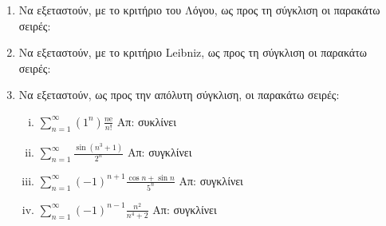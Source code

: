\begin{enumerate}
  \item Να εξεταστούν, με το κριτήριο του Λόγου, ως προς τη σύγκλιση οι παρακάτω σειρές: 


  \item Να εξεταστούν, με το κριτήριο Leibniz, ως προς τη σύγκλιση οι παρακάτω σειρές: 


  \item Να εξεταστούν, ως προς την απόλυτη σύγκλιση, οι παρακάτω σειρές: 

    \begin{enumerate}[i)]
      \item $ \sum_{n=1}^{\infty} (1^{n}) \frac{n \mathrm{e}}{n!} $ 
        \hfill Απ: συκλίνει
      \item $ \sum_{n=1}^{\infty} \frac{\sin{(n^{3}+1)}}{2^{n}} $ \hfill Απ: συγκλίνει 
      \item $ \sum_{n=1}^{\infty} (-1)^{n+1} \frac{\cos{n} + \sin{n}}{5^{n}} $ 
        \hfill Απ: συγκλίνει 
      \item $ \sum_{n=1}^{\infty} (-1)^{n-1} \frac{n^{2}}{n^{4}+2} $ 
        \hfill Απ: συγκλίνει 
    \end{enumerate}
\end{enumerate}

